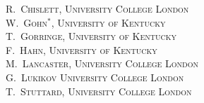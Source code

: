 
\textsc{
\medskip
\hspace*{3.0 cm} R.~Chislett, University College London \\
\medskip
\hspace*{3.0 cm} W.~Gohn$^*$, University of Kentucky \\
\medskip
\hspace*{3.0 cm} T.~Gorringe, University of Kentucky \\
\medskip
\hspace*{3.0 cm} F.~Hahn, University of Kentucky \\
\medskip
\hspace*{3.0 cm} M.~Lancaster, University College London \\
\medskip
\hspace*{3.0 cm} G.~Lukikov University College London \\
\medskip
\hspace*{3.0 cm} T.~Stuttard, University College London
}